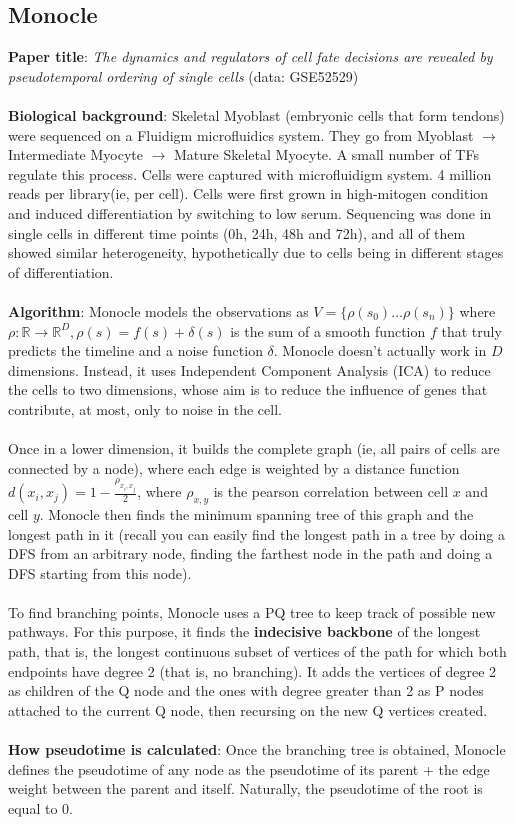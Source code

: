 \documentclass[11pt]{article}
\begin{document}
\subsection{Monocle}
\textbf{Paper title}: \emph{The dynamics and regulators of cell fate decisions are
revealed by pseudotemporal ordering of single cells} (data: GSE52529)\\
\\
\textbf{Biological background}: Skeletal Myoblast (embryonic cells that form tendons) were sequenced on a Fluidigm microfluidics system. They go from Myoblast $\to$ Intermediate Myocyte $\to$ Mature Skeletal Myocyte. A small number of TFs regulate this process. Cells were captured with microfluidigm system. 4 million reads per library(ie, per cell). Cells were first grown in high-mitogen condition and induced differentiation by switching to low serum. Sequencing was done in single cells in different time points (0h, 24h, 48h and 72h), and all of them showed similar heterogeneity, hypothetically due to cells being in different stages of differentiation. \\
\\
\textbf{Algorithm}: Monocle models the observations as $V= \{\rho (s_0) \dots \rho (s_n) \}$ where $\rho : \mathbb{R} \to \mathbb{R}^D, \rho (s) = f(s) + \delta (s)$ is the sum of a smooth function $f$ that truly predicts the timeline and a noise function $\delta$. Monocle doesn't actually work in $D$ dimensions. Instead, it uses Independent Component Analysis (ICA) to reduce the cells to two dimensions, whose aim is to reduce the influence of genes that contribute, at most, only to noise in the cell. \\
\\
Once in a lower dimension, it builds the complete graph (ie, all pairs of cells are connected by a node), where each edge is weighted by a distance function $d(x_i,x_j) = 1 - \frac{\rho_{x_i,x_j}}{2}$, where $\rho_{x,y}$ is the pearson correlation between cell $x$ and cell $y$. Monocle then finds the minimum spanning tree of this graph and the longest path in it (recall you can easily find the longest path in a tree by doing a DFS from an arbitrary node, finding the farthest node in the path and doing a DFS starting from this node).  \\
\\
To find branching points, Monocle uses a PQ tree to keep track of possible new pathways. For this purpose, it finds the \textbf{indecisive backbone} of the longest path, that is, the longest continuous subset of vertices of the path for which both endpoints have degree 2 (that is, no branching). It adds the vertices of degree 2 as children of the Q node and the ones with degree greater than 2 as P nodes attached to the current Q node, then recursing on the new Q vertices created. \\
\\
\textbf{How pseudotime is calculated}: Once the branching tree is obtained, Monocle defines the pseudotime of any node as the pseudotime of its parent + the edge weight between the parent and itself. Naturally, the pseudotime of the root is equal to 0. 
\end{document}
